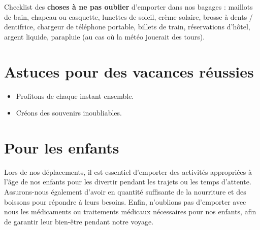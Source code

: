\documentclass[11pt]{article}
\begin{document}
Checklist des \textbf{choses à ne pas oublier} d'emporter dans nos bagages : maillots de
bain, chapeau ou casquette, lunettes de soleil, crème solaire, brosse à dents /
dentifrice, chargeur de téléphone portable, billets de train, réservations
d'hôtel, argent liquide, parapluie (au cas où la météo jouerait des tours).

\section{Astuces pour des vacances réussies}
\label{sec:org378e8ac}

\begin{itemize}
\item Profitons de chaque instant ensemble.
\item Créons des souvenirs inoubliables.
\end{itemize}

\section{Pour les enfants}
\label{sec:org9c3aacc}

Lors de nos déplacements, il est essentiel d'emporter des activités appropriées
à l'âge de nos enfants pour les divertir pendant les trajets ou les temps
d'attente. Assurons-nous également d'avoir en quantité suffisante de la
nourriture et des boissons pour répondre à leurs besoins. Enfin, n'oublions pas
d'emporter avec nous les médicaments ou traitements médicaux nécessaires pour
nos enfants, afin de garantir leur bien-être pendant notre voyage.
\end{document}
